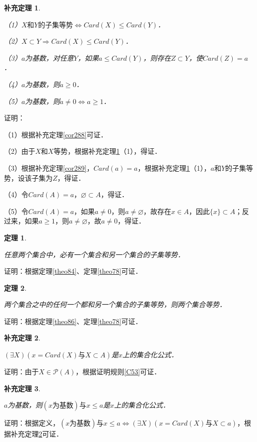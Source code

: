 \documentclass[12pt, a4paper, oneside]{book}
\newtheorem{theo}{定理}
\newtheorem{cor}{补充定理}
\begin{document}
			\begin{cor}\label{cor291}
				\hfill\par
				（1）$X\text{和}Y\text{的子集等势}\Leftrightarrow Card(X)\leq Card(Y)$．
				\par
				（2）$X\subset Y\Rightarrow Card(X)\leq Card(Y)$．
				\par
				（3）$a$为基数，对任意$Y$，如果$a\leq Card(Y)$，则存在$Z\subset Y$，使$Card(Z)=a$．
				\par
				（4）$a$为基数，则$a\geq 0$．
				\par
				（5）$a$为基数，则$a\neq 0\Leftrightarrow a\geq 1$．
			\end{cor}
			证明：
			\par
			（1）根据补充定理\ref{cor288}可证．
			\par
			（2）由于$X$和$X$等势，根据补充定理\ref{cor291}（1），得证．
			\par
			（3）根据补充定理\ref{cor289}，$Card(a)=a$，根据补充定理\ref{cor291}（1），$a$和$Y$的子集等势，设该子集为$Z$，得证．
			\par
			（4）令$Card(A)=a$，$\varnothing\subset A$，得证．
			\par
			（5）令$Card(A)=a$，如果$a\neq 0$，则$a\neq \varnothing$，故存在$x\in A$，因此$\{x\}\subset A$；反过来，如果$a\geq 1$，则$a\neq \varnothing$，故$a\neq 0$，得证．
			
			\begin{theo}\label{theo90}
				\hfill\par
				任意两个集合中，必有一个集合和另一个集合的子集等势．
			\end{theo}
			证明：根据定理\ref{theo84}、定理\ref{theo78}可证．

			\begin{theo}\label{theo91}
				\hfill\par
				两个集合之中的任何一个都和另一个集合的子集等势，则两个集合等势．
			\end{theo}
			证明：根据定理\ref{theo86}、定理\ref{theo78}可证．
			
			\begin{cor}\label{cor292}
				\hfill\par
				$(\exists X)(x=Card(X)\text{与}X\subset A)$是$x$上的集合化公式．
			\end{cor}
			证明：由于$X\in \mathcal{P}(A)$，根据证明规则\ref{C53}可证．
			
			\begin{cor}\label{cor293}
				\hfill\par
				$a$为基数，则$(x\text{为基数})\text{与}x\leq a$是$x$上的集合化公式．	
			\end{cor}
			证明：根据定义，$(x\text{为基数})\text{与}x\leq a\Leftrightarrow (\exists X)(x=Card(X)\text{与}X\subset a)$，根据补充定理\ref{cor292}可证．
			
\end{document}
